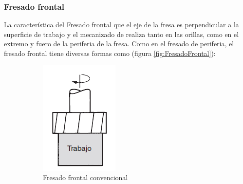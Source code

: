 \subsubsection*{Fresado frontal}
 La característica del Fresado frontal que el eje de la fresa es perpendicular a la superficie de trabajo y el mecanizado de realiza tanto en las orillas, como en el extremo y fuero de la periferia de la fresa. Como en el fresado de periferia, el fresado frontal tiene diversas formas como (figura \ref{fig:FresadoFrontal}):
 
\begin{figure}[hbt]
    \centering
    \begin{subfigure}{0.25\textwidth}
        \centering
        \includegraphics[width=0.9\linewidth]{Cap1_FormulaciondelProyecto/Figuras/a.PNG}
        \caption{Fresado frontal convencional}
        \label{fig:FresadoFC}
    \end{subfigure} 
    \begin{subfigure}{0.25\textwidth}

\end{subfigure}
\end{figure}
